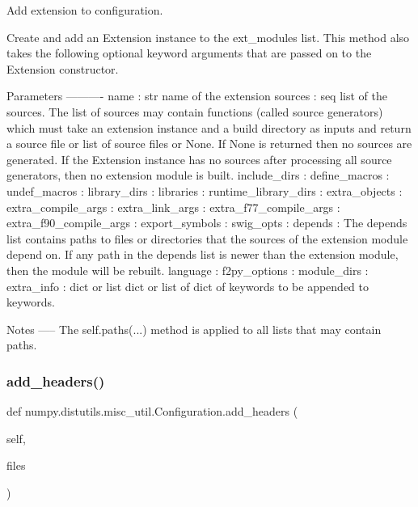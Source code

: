 \begin{DoxyVerb}Add extension to configuration.

Create and add an Extension instance to the ext_modules list. This
method also takes the following optional keyword arguments that are
passed on to the Extension constructor.

Parameters
----------
name : str
    name of the extension
sources : seq
    list of the sources. The list of sources may contain functions
    (called source generators) which must take an extension instance
    and a build directory as inputs and return a source file or list of
    source files or None. If None is returned then no sources are
    generated. If the Extension instance has no sources after
    processing all source generators, then no extension module is
    built.
include_dirs :
define_macros :
undef_macros :
library_dirs :
libraries :
runtime_library_dirs :
extra_objects :
extra_compile_args :
extra_link_args :
extra_f77_compile_args :
extra_f90_compile_args :
export_symbols :
swig_opts :
depends :
    The depends list contains paths to files or directories that the
    sources of the extension module depend on. If any path in the
    depends list is newer than the extension module, then the module
    will be rebuilt.
language :
f2py_options :
module_dirs :
extra_info : dict or list
    dict or list of dict of keywords to be appended to keywords.

Notes
-----
The self.paths(...) method is applied to all lists that may contain
paths.
\end{DoxyVerb}
 \mbox{\label{classnumpy_1_1distutils_1_1misc__util_1_1Configuration_a678836b90abab275f46bea7e3b92a8c1}} 
\subsubsection{\texorpdfstring{add\+\_\+headers()}{add\_headers()}}
{\footnotesize\ttfamily def numpy.\+distutils.\+misc\+\_\+util.\+Configuration.\+add\+\_\+headers (\begin{DoxyParamCaption}\item[{}]{self,  }\item[{}]{files }\end{DoxyParamCaption})}

